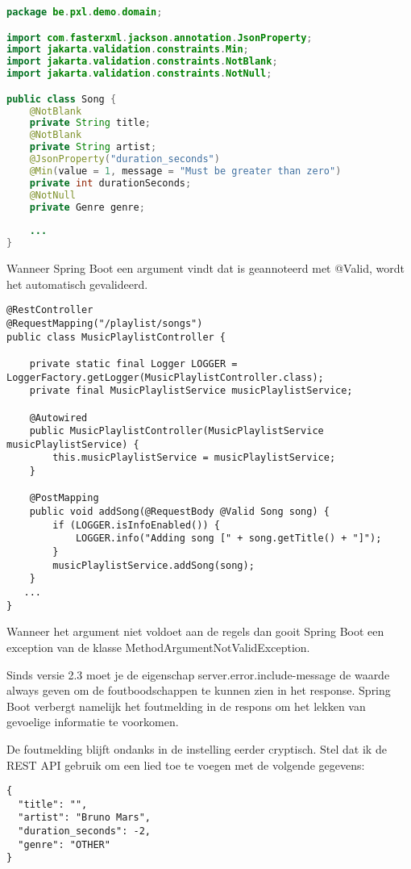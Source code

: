 \begin{lstlisting}[language=java, frame=single]
package be.pxl.demo.domain;

import com.fasterxml.jackson.annotation.JsonProperty;
import jakarta.validation.constraints.Min;
import jakarta.validation.constraints.NotBlank;
import jakarta.validation.constraints.NotNull;

public class Song {
	@NotBlank
	private String title;
	@NotBlank
	private String artist;
	@JsonProperty("duration_seconds")
	@Min(value = 1, message = "Must be greater than zero")
	private int durationSeconds;
	@NotNull
	private Genre genre;
	
	...
}
\end{lstlisting}

Wanneer Spring Boot een argument vindt dat is geannoteerd met @Valid,  wordt het automatisch gevalideerd.

\begin{lstlisting}
@RestController
@RequestMapping("/playlist/songs")
public class MusicPlaylistController {

	private static final Logger LOGGER = LoggerFactory.getLogger(MusicPlaylistController.class);
	private final MusicPlaylistService musicPlaylistService;

	@Autowired
	public MusicPlaylistController(MusicPlaylistService musicPlaylistService) {
		this.musicPlaylistService = musicPlaylistService;
	}

	@PostMapping
	public void addSong(@RequestBody @Valid Song song) {
		if (LOGGER.isInfoEnabled()) {
			LOGGER.info("Adding song [" + song.getTitle() + "]");
		}
		musicPlaylistService.addSong(song);
	}
   ...
}
\end{lstlisting}

Wanneer het argument niet voldoet aan de regels dan gooit Spring Boot een exception van de klasse MethodArgumentNotValidException.

Sinds versie 2.3 moet je de eigenschap server.error.include-message de waarde always geven om de foutboodschappen te kunnen zien in het response. Spring Boot verbergt namelijk het foutmelding in de respons om het lekken van gevoelige informatie te voorkomen. 

De foutmelding blijft ondanks in de instelling eerder cryptisch.  Stel dat ik de REST API gebruik om een lied toe te voegen met de volgende gegevens:

\begin{verbatim}
{
  "title": "",
  "artist": "Bruno Mars",
  "duration_seconds": -2,
  "genre": "OTHER"
}
\end{verbatim}


